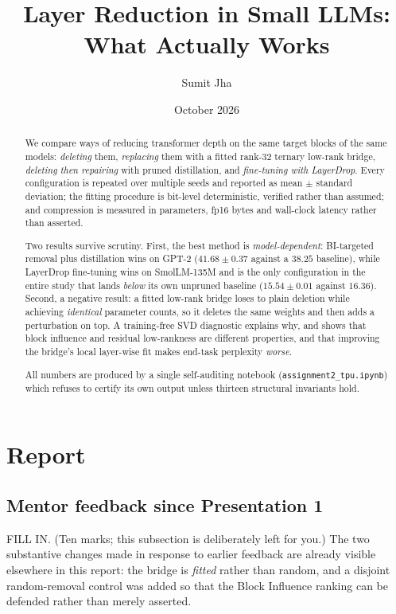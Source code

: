 \documentclass[11pt]{article}
\title{Layer Reduction in Small LLMs: What Actually Works}
\author{Sumit Jha}
\date{October 2026}
\begin{document}
\maketitle
\sloppy

\begin{abstract}
We compare ways of reducing transformer depth on the same target blocks of
the same models: \emph{deleting} them, \emph{replacing} them with a fitted
rank-32 ternary low-rank bridge, \emph{deleting then repairing} with pruned
distillation, and \emph{fine-tuning with LayerDrop}. Every configuration is
repeated over multiple seeds and reported as mean $\pm$ standard deviation;
the fitting procedure is bit-level deterministic, verified rather than
assumed; and compression is measured in parameters, fp16 bytes and wall-clock
latency rather than asserted.

Two results survive scrutiny. First, the best method is
\emph{model-dependent}: BI-targeted removal plus distillation wins on GPT-2
($41.68 \pm 0.37$ against a $38.25$ baseline), while LayerDrop fine-tuning
wins on SmolLM-135M and is the only configuration in the entire study that
lands \emph{below} its own unpruned baseline ($15.54 \pm 0.01$ against
$16.36$). Second, a negative result: a fitted low-rank bridge loses to plain
deletion while achieving \emph{identical} parameter counts, so it deletes the
same weights and then adds a perturbation on top. A training-free SVD
diagnostic explains why, and shows that block influence and residual
low-rankness are different properties, and that improving the bridge's local
layer-wise fit makes end-task perplexity \emph{worse}.

All numbers are produced by a single self-auditing notebook
(\texttt{assignment2\_tpu.ipynb}) which refuses to certify its own output
unless thirteen structural invariants hold.
\end{abstract}

\section{Report}

\subsection{Mentor feedback since Presentation 1}
FILL IN. (Ten marks; this subsection is deliberately left for you.) The two
substantive changes made in response to earlier feedback are already visible
elsewhere in this report: the bridge is \emph{fitted} rather than random, and
a disjoint random-removal control was added so that the Block Influence
ranking can be defended rather than merely asserted.
\end{document}
